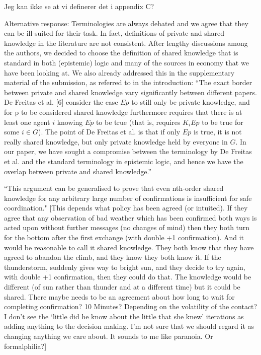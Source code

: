\documentclass[a4paper]{article}
\newenvironment{tobo}{\smallskip \noindent \color{yellow!80!black!80}}{\color{black}\smallskip}
\begin{document}
\begin{tobo}
Jeg kan ikke se at vi definerer det i appendix C?
\end{tobo}

\begin{tobo}
Alternative response: Terminologies are always debated and we agree that they can be ill-suited for their task. In fact, definitions of private and shared knowledge in the literature are not consistent. After lengthy discussions among the authors, we decided to choose the definition of shared knowledge that is standard in both (epistemic) logic and many of the sources in economy that we have been looking at. We also already addressed this in the supplementary material of the submission, as referred to in the introduction:  ``The exact border between private and shared knowledge vary significantly between different papers. De Freitas et al. [6] consider the case $Ep$ to still only be private knowledge, and for p to be considered shared knowledge furthermore requires that there is at least one agent $i$ knowing $Ep$ to be true (that is, requires $K_i Ep$ to be true for some $i \in G$). The point of De Freitas et al. is that if only $Ep$ is true, it is not really shared knowledge, but only private knowledge held by everyone in $G$. In our paper, we have sought a compromise between the terminology by De Freitas et al. and the standard terminology in epistemic logic, and hence we have the overlap between private and shared knowledge.''
\end{tobo}


``This argument can be generalised to prove that even nth-order shared knowledge for any arbitrary large number of confirmations is insufficient for safe coordination." [This depends what policy has been agreed (or intuited). If they agree that any observation of bad weather which has been confirmed both ways is acted upon without further messages (no changes of mind) then they both turn for the bottom after the first exchange (with double +1 confirmation). And it would be reasonable to call it shared knowledge. They both know that they have agreed to abandon the climb, and they know they both know it. If the thunderstorm, suddenly gives way to bright sun, and they decide to try again, with double +1 confirmation, then they could do that. The knowledge would be different (of sun rather than thunder and at a different time) but it could be shared. There maybe needs to be an agreement about how long to wait for completing confirmation? 10 Minutes? Depending on the volatility of the contact? I don't see the `little did he know about the little that she knew' iterations as adding anything to the decision making. I'm not sure that we should regard it as changing anything we care about. It sounds to me like paranoia. Or formalphilia?]
\end{document}
